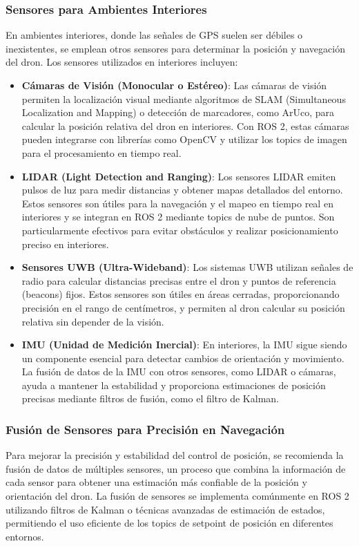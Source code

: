     \subsubsection{Sensores para Ambientes Interiores}
    En ambientes interiores, donde las señales de GPS suelen ser débiles o inexistentes, se emplean otros sensores para determinar la posición y navegación del dron. Los sensores utilizados en interiores incluyen:
        \begin{itemize}
            \item \textbf{Cámaras de Visión (Monocular o Estéreo)}: Las cámaras de visión permiten la localización visual mediante algoritmos de SLAM (Simultaneous Localization and Mapping) o detección de marcadores, como ArUco, para calcular la posición relativa del dron en interiores. Con ROS 2, estas cámaras pueden integrarse con librerías como OpenCV y utilizar los topics de imagen para el procesamiento en tiempo real.
            
            \item \textbf{LIDAR (Light Detection and Ranging)}: Los sensores LIDAR emiten pulsos de luz para medir distancias y obtener mapas detallados del entorno. Estos sensores son útiles para la navegación y el mapeo en tiempo real en interiores y se integran en ROS 2 mediante topics de nube de puntos. Son particularmente efectivos para evitar obstáculos y realizar posicionamiento preciso en interiores.
    
            \item \textbf{Sensores UWB (Ultra-Wideband)}: Los sistemas UWB utilizan señales de radio para calcular distancias precisas entre el dron y puntos de referencia (beacons) fijos. Estos sensores son útiles en áreas cerradas, proporcionando precisión en el rango de centímetros, y permiten al dron calcular su posición relativa sin depender de la visión.
    
            \item \textbf{IMU (Unidad de Medición Inercial)}: En interiores, la IMU sigue siendo un componente esencial para detectar cambios de orientación y movimiento. La fusión de datos de la IMU con otros sensores, como LIDAR o cámaras, ayuda a mantener la estabilidad y proporciona estimaciones de posición precisas mediante filtros de fusión, como el filtro de Kalman.
        \end{itemize}
    
    \subsubsection{Fusión de Sensores para Precisión en Navegación}
    Para mejorar la precisión y estabilidad del control de posición, se recomienda la fusión de datos de múltiples sensores, un proceso que combina la información de cada sensor para obtener una estimación más confiable de la posición y orientación del dron. La fusión de sensores se implementa comúnmente en ROS 2 utilizando filtros de Kalman o técnicas avanzadas de estimación de estados, permitiendo el uso eficiente de los topics de setpoint de posición en diferentes entornos.
    
